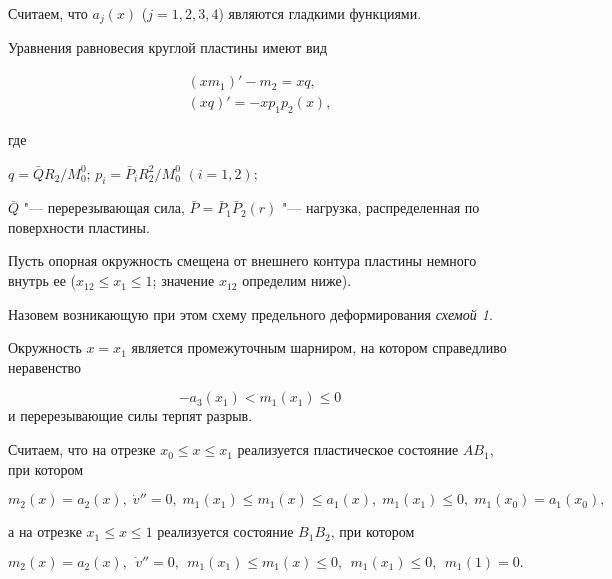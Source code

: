 Считаем, что $a_j(x)$ ($j=1, 2, 3, 4$) являются гладкими функциями.



\smallskip




Уравнения равновесия круглой пластины имеют вид

\begin{gather}

\label{rom8}

(xm_1)'-m_2=xq,

\\

\label{rom9}

(xq)'=-xp_1 p_2(x),

\end{gather}

где

$q=\bar{Q}R_2/M_0^0$; $p_i=\bar{P}_iR_2^2/M_0^0$ $(i=1, 2)$;

$\bar{Q}$ "--- перерезывающая сила, $\bar{P}=\bar{P}_1\bar{P}_2(r)$ "--- нагрузка, распределенная по поверхности пластины.

Пусть опорная окружность смещена от внешнего контура пластины немного внутрь ее ($x_{12}\le x_1\le1$; значение $x_{12}$ определим ниже).

Назовем возникающую при этом схему предельного деформирования {\sl схемой 1}.

Окружность $x=x_1$ является промежуточным шарниром, на котором справедливо неравенство

$$-a_3(x_1)<m_1(x_1)\le0$$ и перерезывающие силы терпят разрыв.

Считаем, что на отрезке $x_0\le x\le x_1$ реализуется пластическое состояние $AB_1$, при котором

\begin{equation}

\label{rom10}

m_2(x)=a_2(x),\; {\dot{v}}''=0,\; m_1(x_1)\le m_1(x)\le a_1(x),\; m_1(x_1)\le0,\; m_1(x_0)=a_1(x_0),

\end{equation}

а на отрезке $x_1\le x\le1$ реализуется состояние $B_1B_2$, при котором

\begin{equation}

\label{rom11}

m_2(x)=a_2(x),\ \ {\dot{v}}''=0,\ \ m_1(x_1)\le m_1(x)\le0,\ \ m_1(x_1)\le0,\ \ m_1(1)=0.

\end{equation}



